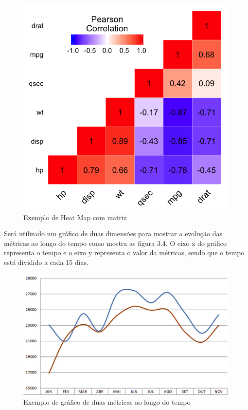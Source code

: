 \begin{figure}[H]
	\captionsetup{justification=centering}
	\centerline{\includegraphics[scale=0.3]{heatmap.png}}
	\caption{Exemplo de Heat Map com matriz}
	\label{figura:heatmap}
\end{figure}

Será utilizado um gráfico de duas dimensões para mostrar a evolução das métricas ao longo do tempo como mostra as figura 3.4. O eixo x do gráfico representa o tempo e o eixo y representa o valor da métricas, sendo que o tempo está dividido a cada 15 dias.

\begin{figure}[H]
	\captionsetup{justification=centering}
	\centerline{\includegraphics[scale=0.5]{metricaex.png}}
	\caption{Exemplo de gráfico de duas métricas ao longo do tempo}
	\label{figura:exmetrica}
\end{figure}


